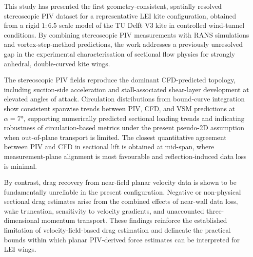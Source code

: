 \documentclass[wes, manuscript]{copernicus}
\begin{document}

This study has presented the first geometry-consistent, spatially resolved stereoscopic PIV dataset for a representative LEI kite configuration, obtained from a rigid $1{:}6.5$ scale model of the TU Delft V3 kite in controlled wind-tunnel conditions. By combining stereoscopic PIV measurements with RANS simulations and vortex-step-method predictions, the work addresses a previously unresolved gap in the experimental characterisation of sectional flow physics for strongly anhedral, double-curved kite wings.

The stereoscopic PIV fields reproduce the dominant CFD-predicted topology, including suction-side acceleration and stall-associated shear-layer development at elevated angles of attack. Circulation distributions from bound-curve integration show consistent spanwise trends between PIV, CFD, and VSM predictions at $\alpha=7\unit{\degree}$, supporting numerically predicted sectional loading trends and indicating robustness of circulation-based metrics under the present pseudo-2D assumption when out-of-plane transport is limited. The closest quantitative agreement between PIV and CFD in sectional lift is obtained at mid-span, where measurement-plane alignment is most favourable and reflection-induced data loss is minimal.

By contrast, drag recovery from near-field planar velocity data is shown to be fundamentally unreliable in the present configuration. Negative or non-physical sectional drag estimates arise from the combined effects of near-wall data loss, wake truncation, sensitivity to velocity gradients, and unaccounted three-dimensional momentum transport. These findings reinforce the established limitation of velocity-field-based drag estimation and delineate the practical bounds within which planar PIV-derived force estimates can be interpreted for LEI wings.
\end{document}

